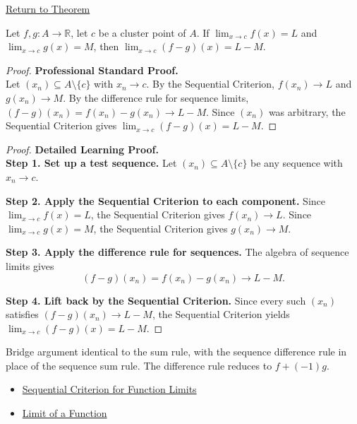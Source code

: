 \newpage
{}
\label{prf:limit-difference}

\begin{remark*}[Return]
\hyperref[thm:limit-difference]{Return to Theorem}
\end{remark*}

\begin{theorem*}
Let $f, g : A \to \mathbb{R}$, let $c$ be a cluster point of $A$. If
$\lim_{x\to c}f(x)=L$ and $\lim_{x\to c}g(x)=M$, then
$\lim_{x\to c}(f-g)(x) = L-M$.
\end{theorem*}

\begin{proof}
\textbf{Professional Standard Proof.}~\\
Let $(x_n) \subseteq A \setminus \{c\}$ with $x_n \to c$.
By the Sequential Criterion, $f(x_n) \to L$ and $g(x_n) \to M$.
By the difference rule for sequence limits, $(f-g)(x_n) = f(x_n)-g(x_n) \to L-M$.
Since $(x_n)$ was arbitrary, the Sequential Criterion gives
$\lim_{x\to c}(f-g)(x) = L-M$.
\end{proof}

\begin{proof}
\textbf{Detailed Learning Proof.}~\\
\textbf{Step 1. Set up a test sequence.}
Let $(x_n) \subseteq A \setminus \{c\}$ be any sequence with $x_n \to c$.

\textbf{Step 2. Apply the Sequential Criterion to each component.}
Since $\lim_{x\to c}f(x)=L$, the Sequential Criterion gives $f(x_n) \to L$.
Since $\lim_{x\to c}g(x)=M$, the Sequential Criterion gives $g(x_n) \to M$.

\textbf{Step 3. Apply the difference rule for sequences.}
The algebra of sequence limits gives
\[
  (f-g)(x_n) = f(x_n) - g(x_n) \to L - M.
\]

\textbf{Step 4. Lift back by the Sequential Criterion.}
Since every such $(x_n)$ satisfies $(f-g)(x_n) \to L-M$, the Sequential
Criterion yields $\lim_{x\to c}(f-g)(x) = L-M$.
\end{proof}

\begin{remark*}
Bridge argument identical to the sum rule, with the sequence difference rule
in place of the sequence sum rule. The difference rule reduces to $f + (-1)g$.
\end{remark*}

\begin{remark*}[Dependencies]
\begin{itemize}
  \item \hyperref[prop:sequential-criterion-limits]{Sequential Criterion for Function Limits}
  \item \hyperref[def:limit-function]{Limit of a Function}
\end{itemize}
\end{remark*}
